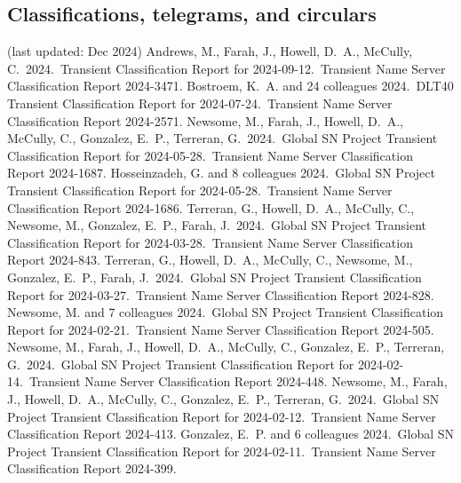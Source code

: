\documentclass[margin,line]{res}
\begin{document}
\begin{resume}
\section{\sc Classifications, telegrams, and circulars}
(last updated: Dec 2024)
 Andrews, M., Farah, J., Howell, D.~A., McCully, C.\ 2024.\ Transient Classification Report for 2024-09-12.\ Transient Name Server Classification Report 2024-3471.
 Bostroem, K.~A. and 24 colleagues 2024.\ DLT40 Transient Classification Report for 2024-07-24.\ Transient Name Server Classification Report 2024-2571.
 Newsome, M., Farah, J., Howell, D.~A., McCully, C., Gonzalez, E.~P., Terreran, G.\ 2024.\ Global SN Project Transient Classification Report for 2024-05-28.\ Transient Name Server Classification Report 2024-1687.
 Hosseinzadeh, G. and 8 colleagues 2024.\ Global SN Project Transient Classification Report for 2024-05-28.\ Transient Name Server Classification Report 2024-1686.
 Terreran, G., Howell, D.~A., McCully, C., Newsome, M., Gonzalez, E.~P., Farah, J.\ 2024.\ Global SN Project Transient Classification Report for 2024-03-28.\ Transient Name Server Classification Report 2024-843.
 Terreran, G., Howell, D.~A., McCully, C., Newsome, M., Gonzalez, E.~P., Farah, J.\ 2024.\ Global SN Project Transient Classification Report for 2024-03-27.\ Transient Name Server Classification Report 2024-828.
 Newsome, M. and 7 colleagues 2024.\ Global SN Project Transient Classification Report for 2024-02-21.\ Transient Name Server Classification Report 2024-505.
 Newsome, M., Farah, J., Howell, D.~A., McCully, C., Gonzalez, E.~P., Terreran, G.\ 2024.\ Global SN Project Transient Classification Report for 2024-02-14.\ Transient Name Server Classification Report 2024-448.
 Newsome, M., Farah, J., Howell, D.~A., McCully, C., Gonzalez, E.~P., Terreran, G.\ 2024.\ Global SN Project Transient Classification Report for 2024-02-12.\ Transient Name Server Classification Report 2024-413.
 Gonzalez, E.~P. and 6 colleagues 2024.\ Global SN Project Transient Classification Report for 2024-02-11.\ Transient Name Server Classification Report 2024-399.

\end{resume}
\end{document}
